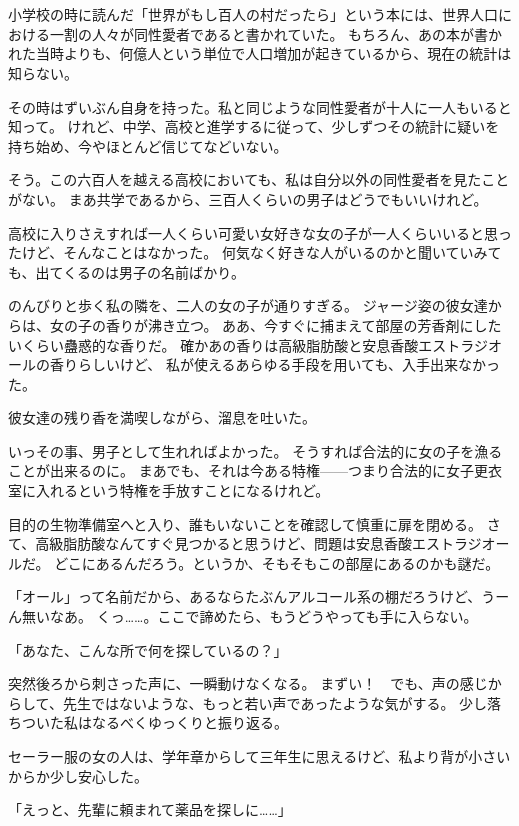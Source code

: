 \chapter{}
小学校の時に読んだ「世界がもし百人の村だったら」という本には、世界人口における一割の人々が同性愛者であると書かれていた。
もちろん、あの本が書かれた当時よりも、何億人という単位で人口増加が起きているから、現在の統計は知らない。

その時はずいぶん自身を持った。私と同じような同性愛者が十人に一人もいると知って。
けれど、中学、高校と進学するに従って、少しずつその統計に疑いを持ち始め、今やほとんど信じてなどいない。

そう。この六百人を越える高校においても、私は自分以外の同性愛者を見たことがない。
まあ共学であるから、三百人くらいの男子はどうでもいいけれど。

高校に入りさえすれば一人くらい可愛い女好きな女の子が一人くらいいると思ったけど、そんなことはなかった。
何気なく好きな人がいるのかと聞いていみても、出てくるのは男子の名前ばかり。

のんびりと歩く私の隣を、二人の女の子が通りすぎる。
ジャージ姿の彼女達からは、女の子の香りが沸き立つ。
ああ、今すぐに捕まえて部屋の芳香剤にしたいくらい蠱惑的な香りだ。
確かあの香りは高級脂肪酸と安息香酸エストラジオールの香りらしいけど、
私が使えるあらゆる手段を用いても、入手出来なかった。

彼女達の残り香を満喫しながら、溜息を吐いた。

いっその事、男子として生れればよかった。
そうすれば合法的に女の子を漁ることが出来るのに。
まあでも、それは今ある特権------つまり合法的に女子更衣室に入れるという特権を手放すことになるけれど。

目的の生物準備室へと入り、誰もいないことを確認して慎重に扉を閉める。
さて、高級脂肪酸なんてすぐ見つかると思うけど、問題は安息香酸エストラジオールだ。
どこにあるんだろう。というか、そもそもこの部屋にあるのかも謎だ。

「オール」って名前だから、あるならたぶんアルコール系の棚だろうけど、うーん無いなあ。
くっ……。ここで諦めたら、もうどうやっても手に入らない。

「あなた、こんな所で何を探しているの？」

突然後ろから刺さった声に、一瞬動けなくなる。
まずい！　でも、声の感じからして、先生ではないような、もっと若い声であったような気がする。
少し落ちついた私はなるべくゆっくりと振り返る。

セーラー服の女の人は、学年章からして三年生に思えるけど、私より背が小さいからか少し安心した。

「えっと、先輩に頼まれて薬品を探しに……」

